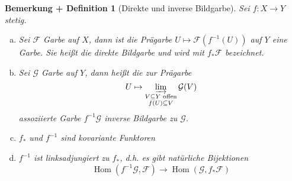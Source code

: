 \documentclass[a4paper,oneside]{scrbook}
\theoremstyle{break}
\newtheorem{BemDef}[Def]{Bemerkung + Definition}
\theoremstyle{nonumberbreak}
\theoremstyle{nonumberplain}
\theoremstyle{break}
\newcommand{\directlim}{%
	\ensuremath{\varinjlim}%
}
\DeclareMathOperator{\Hom}{Hom}
\begin{document}
\begin{BemDef}[Direkte und inverse Bildgarbe]
	\label{def:image_sheaf}
	Sei $f: X \to Y$ stetig.
	\begin{enumerate}[(a)]
		\item Sei $\mathcal{F}$ Garbe auf $X$, dann ist die Prägarbe $U \mapsto \mathcal{F}( f^{-1}(U) )$ auf $Y$ eine Garbe.
		Sie heißt die \emph{direkte Bildgarbe} und wird mit $f_{*}\mathcal{F}$ bezeichnet.
		\item Sei $\mathcal{G}$ Garbe auf $Y$, dann heißt die zur Prägarbe 
		\[ U \mapsto \directlim_{\substack{V \subseteq Y\text{ offen}\\f(U) \subseteq V}} \mathcal{G}(V) \]
		assoziierte Garbe $f^{-1}\mathcal{G}$ \emph{inverse Bildgarbe} zu $\mathcal{G}$.
		\item $f_{*}$ und $f^{-1}$ sind kovariante Funktoren
		\item $f^{-1}$ ist linksadjungiert zu $f_{*}$, d.h. es gibt natürliche Bijektionen
		\[ \Hom(f^{-1}\mathcal{G}, \mathcal{F}) \to \Hom( \mathcal{G}, f_{*}\mathcal{F} ) \]
	\end{enumerate}
\end{BemDef}
\end{document}
